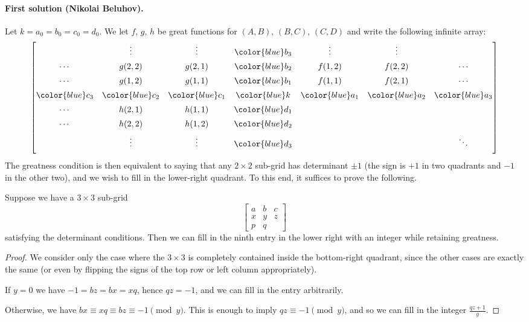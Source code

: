 \paragraph{First solution (Nikolai Beluhov).}
Let $k = a_0 = b_0 = c_0 = d_0$.
We let $f$, $g$, $h$ be great functions for $(A,B)$, $(B,C)$, $(C,D)$
and write the following infinite array:
\[
  \begin{bmatrix}
    & \vdots & \vdots & {\color{blue} b_3} & \vdots & \vdots & \\[5pt]
    \dotsb & g(2,2) & g(2,1) & {\color{blue}b_2} & f(1,2) & f(2,2) & \dotsb \\[5pt]
    \dotsb & g(1,2) & g(1,1) & {\color{blue}b_1} & f(1,1) & f(2,1) & \dotsb \\[5pt]
    {\color{blue}c_3} & {\color{blue}c_2} & {\color{blue}c_1} &
      {\color{blue}k} &
      {\color{blue}a_1} & {\color{blue}a_2} & {\color{blue}a_3} \\[5pt]
    \dotsb & h(2,1) & h(1,1) & {\color{blue}d_1} & & & \\[5pt]
    \dotsb & h(2,2) & h(1,2) & {\color{blue}d_2} & & & \\[5pt]
    & \vdots & \vdots & {\color{blue}d_3} & & & \ddots \\[5pt]
  \end{bmatrix}
\]
The greatness condition is then equivalent to saying
that any $2 \times 2$ sub-grid has determinant $\pm1$
(the sign is $+1$ in two quadrants and $-1$ in the other two),
and we wish to fill in the lower-right quadrant.
To this end, it suffices to prove the following.
\begin{lemma*}
  Suppose we have a $3 \times 3$ sub-grid
  \[
    \begin{bmatrix}
      a & b & c \\
      x & y & z \\
      p & q &
    \end{bmatrix}
  \]
  satisfying the determinant conditions.
  Then we can fill in the ninth entry in the lower right
  with an integer while retaining greatness.
\end{lemma*}
\begin{proof}
  We consider only the case where the $3 \times 3$
  is completely contained inside the bottom-right quadrant,
  since the other cases are exactly the same
  (or even by flipping the signs of the top row
  or left column appropriately).

  If $y = 0$ we have $-1 = bz = bx = xq$, hence $qz = -1$,
  and we can fill in the entry arbitrarily.

  Otherwise, we have $bx \equiv xq \equiv bz \equiv -1 \pmod{y}$.
  This is enough to imply $qz \equiv -1 \pmod y$,
  and so we can fill in the integer $\frac{qz+1}{y}$.
\end{proof}

